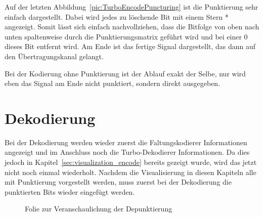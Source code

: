 Auf der letzten Abbildung~\ref{pic:TurboEncodePuncturing} ist die Punktierung sehr einfach dargestellt. Dabei wird jedes zu löschende Bit mit einem Stern * angezeigt. Somit lässt sich einfach nachvollziehen, dass die Bitfolge von oben nach unten spaltenweise durch die Punktierungsmatrix geführt wird und bei einer 0 dieses Bit entfernt wird. Am Ende ist das fertige Signal dargestellt, das dann auf den Übertragungskanal gelangt. 

Bei der Kodierung ohne Punktierung ist der Ablauf exakt der Selbe, nur wird eben das Signal am Ende nicht punktiert, sondern direkt ausgegeben.

\FloatBarrier
\section{Dekodierung}
\label{sec:visualization_decode}
Bei der Dekodierung werden wieder zuerst die Faltungskodierer Informationen angezeigt und im Anschluss noch die Turbo-Dekodierer Informationen. Da dies jedoch in Kapitel~\ref{sec:visualization_encode} bereits gezeigt wurde, wird das jetzt nicht noch einmal wiederholt. Nachdem die Visualisierung in diesen Kapiteln alle mit Punktierung vorgestellt werden, muss zuerst bei der Dekodierung die punktierten Bits wieder eingefügt werden.

\begin{figure}[th]
\centering
{}
\caption{Folie zur Veranschaulichung der Depunktierung}
\label{pic:TurboDecodeDepuncturing}
\end{figure}

